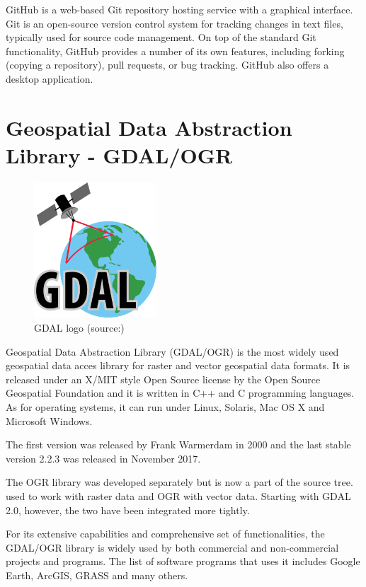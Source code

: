 GitHub is a web-based Git repository hosting service with a graphical interface. Git is an open-source version control system for tracking changes in text files, typically used for source code management.\cite{git}  On top of the standard Git functionality, GitHub provides a number of its own features, including forking (copying a repository), pull requests, or bug tracking. GitHub also offers a desktop application.

\section{Geospatial Data Abstraction Library - GDAL/OGR}

\begin{figure}[H] \centering
      \includegraphics[width=130pt]{./pictures/gdal.png}
      \caption[GDAL logo]{GDAL logo (source:{\cite{gdal}})}
      \label{fig:GDAL}
  \end{figure}

Geospatial Data Abstraction Library (GDAL/OGR) is the most widely used geospatial data acces library for raster and vector geospatial data formats. It is released under an X/MIT style Open Source license by the Open Source Geospatial Foundation and it is written in C++ and C programming languages. As for operating systems, it can run under Linux, Solaris, Mac OS X and Microsoft Windows.\cite{gdal}

The first version was released by Frank Warmerdam in 2000 and the last stable version 2.2.3 was released in November 2017.\cite{gdalrelease}


The OGR library was developed separately but is now a part of the  source tree.  used to work with raster data and OGR with vector data. Starting with GDAL 2.0, however, the two have been integrated more tightly.

For its extensive capabilities and comprehensive set of functionalities, the GDAL/OGR library is widely used by both commercial and non-commercial  projects and programs. The list of software programs that uses it includes Google Earth, ArcGIS, GRASS  and many others.\cite{gdalogr} 
